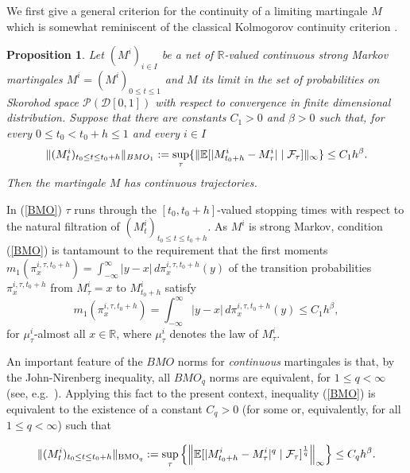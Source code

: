 \documentclass[11pt,a4paper]{article}%
\def\E{{\mathbb E}}
\def\R{{\mathbb R}}
\newtheorem{proposition}[theorem]{Proposition}
\numberwithin{equation}{section}
\begin{document}
We first give a general criterion for the continuity of a limiting martingale $M$ which is somewhat reminiscent of the classical Kolmogorov continuity criterion \cite[Theorem 1.8]{ReYo99}.

\begin{proposition}\label{criterion}
	Let $(M^i)_{i \in I}$ be a net of $\R$-valued continuous strong Markov martingales  $M^i = (M^i)_{0 \le t \le 1}$ and $M$ its limit in the set of probabilities on Skorohod space $\mathcal P(\mathcal D[0,1])$ with respect to convergence in finite dimensional distribution.
	Suppose that there are constants $C_1>0$ and $\beta > 0$ such that, for every $0 \le t_0 < t_0 + h \le 1$ and every $i \in I$
	\begin {equation}\label{BMO}
	\lVert (M^i_t)_{t_0 \le t \le t_0 + h}\rVert_{{BMO}_1} := \sup_\tau\{ \lVert \E[|M^i_{t_0 + h} -M^i_\tau| \mid {\cal{F}}_{\tau}] \rVert_\infty   \}   \le  C_1 h^\beta.
	\end{equation}
	Then the martingale $M$ has continuous trajectories.
\end{proposition}

In (\ref{BMO}) $\tau$ runs through the $[t_0,t_0 + h]$-valued stopping times with respect to the natural filtration of $ (M^i_t)_{t_0 \le t \le t_0 + h}$. 
As $M^i$ is strong Markov, condition (\ref{BMO}) is tantamount to the requirement that the first moments $m_1(\pi_x^{i,\tau ,t_0 +h}) = \int_{-\infty}^\infty |y-x| \, d\pi_x^{i ,\tau ,t_0 +h}(y)$ of the transition probabilities $\pi_x^{i,\tau,t_0+h}$ from $M^i_\tau = x$ to $M^i_{t_0 + h}$ satisfy 
\begin{equation}\label {beta}
 	m_1( \pi_x^{i,\tau,t_0 +h})  = \int_{-\infty}^\infty |y-x| \, d\pi_x^{i ,\tau ,t_0 +h}(y) \le C_1 h^\beta, 
\end{equation}
for $\mu^i_\tau$-almost all $x \in \R$, where $\mu^i_\tau$ denotes the law of $M^i _\tau$.

An important feature of the $BMO$ norms for \textit{continuous} martingales is that, by  the John-Nirenberg inequality, all $BMO_q$ norms are equivalent, for $1 \le q < \infty$ (see, e.g.\ \cite[Corollary 2.1]{Ka06b}). Applying this fact to the present context, inequality (\ref{BMO}) is equivalent to the existence of a constant $C_q > 0$ (for some or, equivalently, for all $1 \le q < \infty$) such that

\begin {equation}\label{BMOq}
\lVert (M^i_t)_{t_0 \le t \le t_0 + h}\rVert_{\text{BMO}_q} := \sup_\tau\left\{ \left\lVert \E[|M^i_{t_0 + h} -M^i_\tau|^q \mid {\cal{F}}_{\tau}]^{\frac{1}{q}} \right\rVert_\infty \right\} \le C_q h^\beta.
\end{equation}
\end{document}
